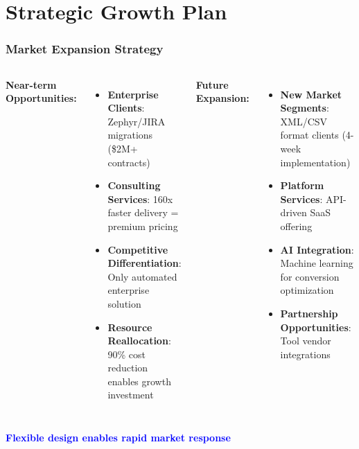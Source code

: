 \section{Strategic Growth Plan}
\begin{frame}
\frametitle{Market Expansion Strategy}
\begin{columns}
\textbf{Near-term Opportunities:}
\begin{itemize}
    \item \textbf{Enterprise Clients}: Zephyr/JIRA migrations (\$2M+ contracts)
    \item \textbf{Consulting Services}: 160x faster delivery = premium pricing
    \item \textbf{Competitive Differentiation}: Only automated enterprise solution
    \item \textbf{Resource Reallocation}: 90\% cost reduction enables growth investment
\end{itemize}

\textbf{Future Expansion:}
\begin{itemize}
    \item \textbf{New Market Segments}: XML/CSV format clients (4-week implementation)
    \item \textbf{Platform Services}: API-driven SaaS offering
    \item \textbf{AI Integration}: Machine learning for conversion optimization
    \item \textbf{Partnership Opportunities}: Tool vendor integrations
\end{itemize}
\end{columns}

\vspace{0.3cm}
\begin{center}
\textcolor{blue}{\textbf{Flexible design enables rapid market response}}
\end{center}
\end{frame}




